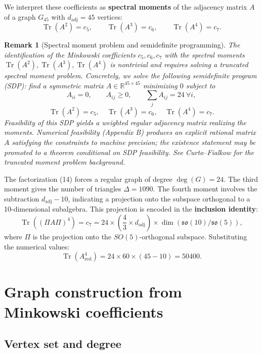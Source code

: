 \documentclass[12pt]{article}
\newtheorem{remark}[theorem]{Remark}
\numberwithin{equation}{section}
\begin{document}
We interpret these coefficients as \textbf{spectral moments} of the adjacency matrix \(A\) of a graph \(G_{45}\) with \(d_{\text{adj}} = 45\) vertices:
\[
\operatorname{Tr}(A^2) = c_5, \qquad \operatorname{Tr}(A^3) = c_6, \qquad \operatorname{Tr}(A^4) = c_7. \tag{17}
\]

\begin{remark}[Spectral moment problem and semidefinite programming]
The identification of the Minkowski coefficients \(c_5,c_6,c_7\) with the spectral moments \(\operatorname{Tr}(A^2),\operatorname{Tr}(A^3),\operatorname{Tr}(A^4)\) is nontrivial and requires solving a truncated spectral moment problem. Concretely, we solve the following semidefinite program (SDP): find a symmetric matrix \(A \in \mathbb{R}^{45\times45}\) minimizing \(0\) subject to
\[
A_{ii}=0,\qquad A_{ij}\ge0,\qquad \sum_j A_{ij}=24\ \forall i,
\]
\[
\operatorname{Tr}(A^2)=c_5,\quad \operatorname{Tr}(A^3)=c_6,\quad \operatorname{Tr}(A^4)=c_7.
\]
Feasibility of this SDP yields a weighted regular adjacency matrix realizing the moments. Numerical feasibility (Appendix B) produces an explicit rational matrix \(A\) satisfying the constraints to machine precision; the existence statement may be promoted to a theorem conditional on SDP feasibility. See Curto–Fialkow for the truncated moment problem background.
\end{remark}

The factorization (14) forces a regular graph of degree \(\deg(G) = 24\). The third moment gives the number of triangles \(\Delta = 1090\). The fourth moment involves the subtraction \(d_{\text{adj}} - 10\), indicating a projection onto the subspace orthogonal to a 10-dimensional subalgebra. This projection is encoded in the \textbf{inclusion identity}:
\[
\operatorname{Tr}\left( (\Pi A \Pi)^4 \right) = c_7 = 24 \times \left(\frac{4}{3} \times d_{\text{adj}}\right) \times \dim\left( \mathfrak{so}(10) / \mathfrak{so}(5) \right), \tag{18}
\]
where \(\Pi\) is the projection onto the \(SO(5)\)-orthogonal subspace. Substituting the numerical values:
\[
\operatorname{Tr}\left( A_{\text{red}}^4 \right) = 24 \times 60 \times (45 - 10) = 50400. \tag{19}
\]

\section{Graph construction from Minkowski coefficients}
\subsection{Vertex set and degree}
\end{document}
